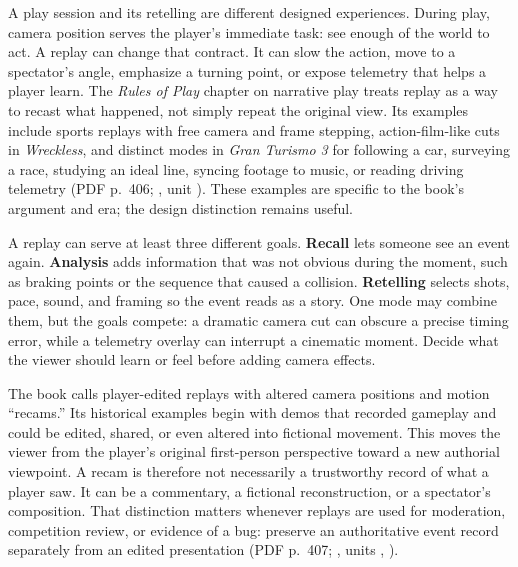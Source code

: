 \hypertarget{06-engine-ii-ch046-let-play-become-a-replayable-story}{}

A play session and its retelling are different designed experiences. During play, camera position serves the player's immediate task: see enough of the world to act. A replay can change that contract. It can slow the action, move to a spectator's angle, emphasize a turning point, or expose telemetry that helps a player learn. The \emph{Rules of Play} chapter on narrative play treats replay as a way to recast what happened, not simply repeat the original view. Its examples include sports replays with free camera and frame stepping, action-film-like cuts in \emph{Wreckless}, and distinct modes in \emph{Gran Turismo 3} for following a car, surveying a race, studying an ideal line, syncing footage to music, or reading driving telemetry (PDF p.~406; , unit ). These examples are specific to the book's argument and era; the design distinction remains useful.

A replay can serve at least three different goals. \textbf{Recall} lets someone see an event again. \textbf{Analysis} adds information that was not obvious during the moment, such as braking points or the sequence that caused a collision. \textbf{Retelling} selects shots, pace, sound, and framing so the event reads as a story. One mode may combine them, but the goals compete: a dramatic camera cut can obscure a precise timing error, while a telemetry overlay can interrupt a cinematic moment. Decide what the viewer should learn or feel before adding camera effects.

The book calls player-edited replays with altered camera positions and motion ``recams.'' Its historical examples begin with demos that recorded gameplay and could be edited, shared, or even altered into fictional movement. This moves the viewer from the player's original first-person perspective toward a new authorial viewpoint. A recam is therefore not necessarily a trustworthy record of what a player saw. It can be a commentary, a fictional reconstruction, or a spectator's composition. That distinction matters whenever replays are used for moderation, competition review, or evidence of a bug: preserve an authoritative event record separately from an edited presentation (PDF p.~407; , units , ).


